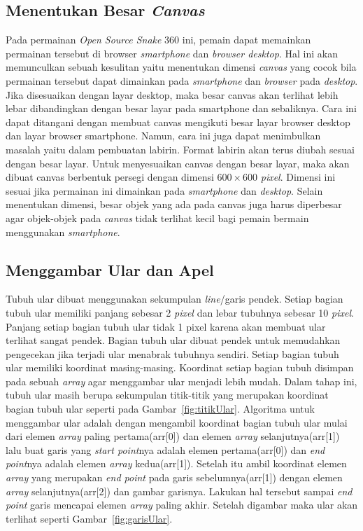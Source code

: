 \subsection{Menentukan Besar \textit{Canvas}}
Pada permainan \textit{Open Source Snake} 360 ini, pemain dapat memainkan permainan tersebut di browser \textit{smartphone} dan \textit{browser desktop}. Hal ini akan memunculkan sebuah kesulitan yaitu menentukan dimensi \textit{canvas} yang cocok bila permainan tersebut dapat dimainkan pada \textit{smartphone} dan \textit{browser} pada \textit{desktop}. Jika disesuaikan dengan layar desktop, maka besar canvas akan terlihat lebih lebar dibandingkan dengan besar layar pada smartphone dan sebaliknya. Cara ini dapat ditangani dengan membuat canvas mengikuti besar layar browser desktop dan layar browser smartphone. Namun, cara ini juga dapat menimbulkan masalah yaitu dalam pembuatan labirin. Format labirin akan terus diubah sesuai dengan besar layar. Untuk menyesuaikan canvas dengan besar layar, maka akan dibuat canvas berbentuk persegi dengan dimensi $600 \times 600$ \textit{pixel}. Dimensi ini sesuai jika permainan ini dimainkan pada \textit{smartphone} dan \textit{desktop}. Selain menentukan dimensi, besar objek yang ada pada canvas juga harus diperbesar agar objek-objek pada \textit{canvas} tidak terlihat kecil bagi pemain bermain menggunakan \textit{smartphone}. 

\subsection{Menggambar Ular dan Apel}
Tubuh ular dibuat menggunakan sekumpulan \textit{line}/garis pendek. Setiap bagian tubuh ular memiliki panjang sebesar 2 \textit{pixel} dan lebar tubuhnya sebesar 10 \textit{pixel}. Panjang setiap bagian tubuh ular tidak 1 pixel karena akan membuat ular terlihat sangat pendek. Bagian tubuh ular dibuat pendek untuk memudahkan pengecekan jika terjadi ular menabrak tubuhnya sendiri. Setiap bagian tubuh ular memiliki koordinat masing-masing. Koordinat setiap bagian tubuh disimpan pada sebuah \textit{array} agar menggambar ular menjadi lebih mudah. Dalam tahap ini, tubuh ular masih berupa sekumpulan titik-titik yang merupakan koordinat bagian tubuh ular seperti pada Gambar~\ref{fig:titikUlar}. Algoritma untuk menggambar ular adalah dengan mengambil koordinat bagian tubuh ular mulai dari elemen \textit{array} paling pertama(arr[0]) dan elemen \textit{array} selanjutnya(arr[1]) lalu buat garis yang \textit{start point}nya adalah elemen pertama(arr[0]) dan \textit{end point}nya adalah elemen \textit{array} kedua(arr[1]). Setelah itu ambil koordinat elemen \textit{array} yang merupakan \textit{end point} pada garis sebelumnya(arr[1]) dengan elemen \textit{array} selanjutnya(arr[2]) dan gambar garisnya. Lakukan hal tersebut sampai \textit{end point} garis mencapai elemen \textit{array} paling akhir. Setelah digambar maka ular akan terlihat seperti Gambar~\ref{fig:garisUlar}.

